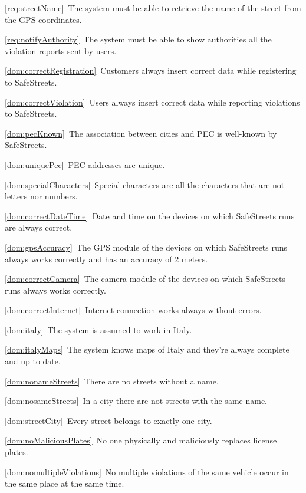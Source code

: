 \begin{description}
\begin{description}
					\item \ref{req:streetName}\ The system must be able to retrieve the name of the street from the GPS coordinates.
					\item \ref{req:notifyAuthority}\ The system must be able to show authorities all the violation reports sent by users.
					\item \ref{dom:correctRegistration}\ Customers always insert correct data while registering to SafeStreets.
					\item \ref{dom:correctViolation}\ Users always insert correct data while reporting violations to SafeStreets.
					\item \ref{dom:pecKnown}\ The association between cities and PEC is well-known by SafeStreets.
					\item \ref{dom:uniquePec}\ PEC addresses are unique.
					\item \ref{dom:specialCharacters}\ Special characters are all the characters that are not letters nor numbers.
					\item \ref{dom:correctDateTime}\ Date and time on the devices on which SafeStreets runs are always correct.
					\item \ref{dom:gpsAccuracy}\ The GPS module of the devices on which SafeStreets runs always works correctly and has an accuracy of 2 meters.
					\item \ref{dom:correctCamera}\ The camera module of the devices on which SafeStreets runs always works correctly.
					\item \ref{dom:correctInternet}\ Internet connection works always without errors.
					\item \ref{dom:italy}\ The system is assumed to work in Italy.
					\item \ref{dom:italyMaps}\ The system knows maps of Italy and they’re always complete and up to date.
					\item \ref{dom:nonameStreets}\ There are no streets without a name.
					\item \ref{dom:nosameStreets}\ In a city there are not streets with the same name.
					\item \ref{dom:streetCity}\ Every street belongs to exactly one city.
					\item \ref{dom:noMaliciousPlates}\ No one physically and maliciously replaces license plates.
					\item \ref{dom:nomultipleViolations}\ No multiple violations of the same vehicle occur in the same place at the same time.
				\end{description}
					

\end{description}

